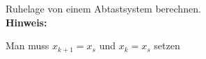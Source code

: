 \begin{question}[section=6,name={Ruhelage},difficulty=,type=mdl,tags={}]
	Ruhelage von einem Abtastsystem berechnen.
	\\ \textbf{Hinweis:}\\
	
\end{question}
\begin{solution}
	Man muss $x_{k+1} = x_s$ und $x_k = x_s$ setzen
\end{solution}